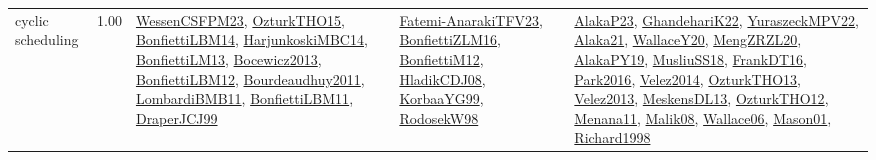 {\begin{longtable}{p{3cm}r>{\raggedright\arraybackslash}p{6cm}>{\raggedright\arraybackslash}p{6cm}>{\raggedright\arraybackslash}p{8cm}}
\index{cyclic scheduling}\index{Concepts!cyclic scheduling}cyclic scheduling &  1.00 & \hyperref[detail:WessenCSFPM23]{WessenCSFPM23}, \hyperref[detail:OzturkTHO15]{OzturkTHO15}, \hyperref[detail:BonfiettiLBM14]{BonfiettiLBM14}, \hyperref[detail:HarjunkoskiMBC14]{HarjunkoskiMBC14}, \hyperref[detail:BonfiettiLM13]{BonfiettiLM13}, \hyperref[detail:Bocewicz2013]{Bocewicz2013}, \hyperref[detail:BonfiettiLBM12]{BonfiettiLBM12}, \hyperref[detail:Bourdeaudhuy2011]{Bourdeaudhuy2011}, \hyperref[detail:LombardiBMB11]{LombardiBMB11}, \hyperref[detail:BonfiettiLBM11]{BonfiettiLBM11}, \hyperref[detail:DraperJCJ99]{DraperJCJ99} & \hyperref[detail:Fatemi-AnarakiTFV23]{Fatemi-AnarakiTFV23}, \hyperref[detail:BonfiettiZLM16]{BonfiettiZLM16}, \hyperref[detail:BonfiettiM12]{BonfiettiM12}, \hyperref[detail:HladikCDJ08]{HladikCDJ08}, \hyperref[detail:KorbaaYG99]{KorbaaYG99}, \hyperref[detail:RodosekW98]{RodosekW98} & \hyperref[detail:AlakaP23]{AlakaP23}, \hyperref[detail:GhandehariK22]{GhandehariK22}, \hyperref[detail:YuraszeckMPV22]{YuraszeckMPV22}, \hyperref[detail:Alaka21]{Alaka21}, \hyperref[detail:WallaceY20]{WallaceY20}, \hyperref[detail:MengZRZL20]{MengZRZL20}, \hyperref[detail:AlakaPY19]{AlakaPY19}, \hyperref[detail:MusliuSS18]{MusliuSS18}, \hyperref[detail:FrankDT16]{FrankDT16}, \hyperref[detail:Park2016]{Park2016}, \hyperref[detail:Velez2014]{Velez2014}, \hyperref[detail:OzturkTHO13]{OzturkTHO13}, \hyperref[detail:Velez2013]{Velez2013}, \hyperref[detail:MeskensDL13]{MeskensDL13}, \hyperref[detail:OzturkTHO12]{OzturkTHO12}, \hyperref[detail:Menana11]{Menana11}, \hyperref[detail:Malik08]{Malik08}, \hyperref[detail:Wallace06]{Wallace06}, \hyperref[detail:Mason01]{Mason01}, \hyperref[detail:Richard1998]{Richard1998}\\

\end{longtable}}
